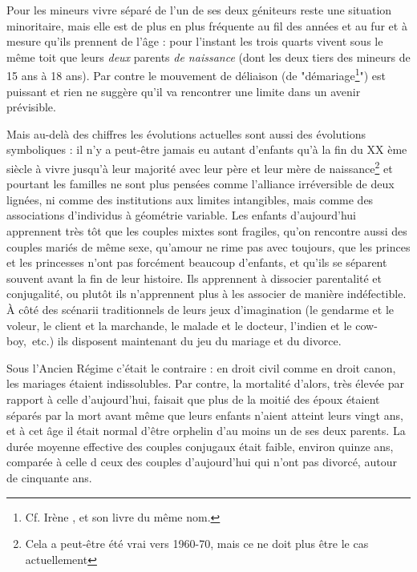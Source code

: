 \begin{table}[t]
\begin{table}[t]
\begin{table}[!t]
\begin{minipage}{\textwidth}
\end{minipage}

\end{table}
 
 
 
 Pour les mineurs vivre séparé de l'un de ses deux géniteurs reste une situation minoritaire, mais elle est de plus en plus fréquente au fil des années et au fur et à mesure qu'ils prennent de l'âge : pour l'instant les trois quarts vivent sous le même toit que leurs \emph{deux} parents \emph{de naissance} (dont les deux tiers des mineurs de 15 ans à 18 ans). Par contre le mouvement de déliaison (de "démariage\footnote{Cf. Irène , et son livre du même nom.}") est puissant et rien ne suggère qu'il va rencontrer une limite dans un avenir prévisible.
 
 Mais au-delà des chiffres les évolutions actuelles sont aussi des évolutions symboliques : il n'y a peut-être jamais eu autant d'enfants qu'à la fin du  XX ème siècle à vivre jusqu'à leur majorité avec leur père et leur mère de naissance\footnote{Cela a peut-être été vrai vers 1960-70, mais ce ne doit plus être le cas actuellement} et pourtant les familles ne sont plus pensées comme l'alliance irréversible de deux lignées, ni comme des institutions aux limites intangibles, mais comme des associations d'individus à géométrie variable. Les enfants d'aujourd'hui apprennent très tôt que les couples mixtes sont fragiles, qu'on rencontre aussi des couples mariés de même sexe, qu'amour ne rime pas avec toujours, que les princes et les princesses n'ont pas forcément beaucoup d'enfants, et qu'ils se séparent souvent avant la fin de leur histoire. Ils apprennent à dissocier parentalité et conjugalité, ou plutôt ils n'apprennent plus à les associer de manière indéfectible. À côté des scénarii traditionnels de leurs jeux d'imagination (le gendarme et le voleur, le client et la marchande, le malade et le docteur, l'indien et le cow-boy,~etc.) ils disposent maintenant du jeu du mariage et du divorce.

 Sous l'Ancien Régime c'était le contraire : en droit civil comme en droit canon, les mariages étaient indissolubles. Par contre, la mortalité d'alors, très élevée par rapport à celle d'aujourd'hui, faisait que plus de la moitié des époux étaient séparés par la mort avant même que leurs enfants n'aient atteint leurs vingt ans, et à cet âge il était normal d'être orphelin d'au moins un de ses deux parents. La durée moyenne effective des couples conjugaux était faible, environ quinze ans, comparée à celle d ceux des couples d'aujourd'hui qui n'ont pas divorcé, autour de cinquante ans. 


\end{table}
\end{table}
